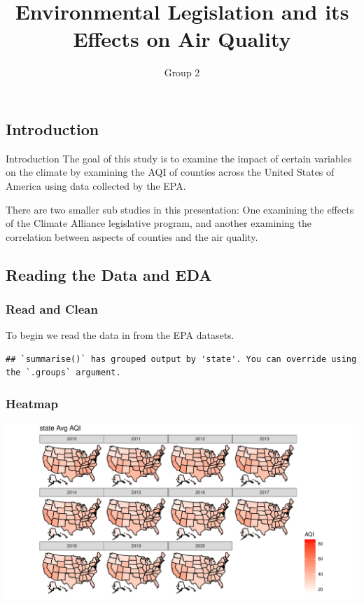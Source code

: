 \documentclass[
  ignorenonframetext,
]{beamer}
\title{Environmental Legislation and its Effects on Air Quality}
\author{Group 2}
\date{}
\begin{document}
\frame{\titlepage}

\hypertarget{introduction}{%
\subsection{Introduction}\label{introduction}}

\begin{frame}{Introduction}
The goal of this study is to examine the impact of certain variables on
the climate by examining the AQI of counties across the United States of
America using data collected by the EPA.

There are two smaller sub studies in this presentation: One examining
the effects of the Climate Alliance legislative program, and another
examining the correlation between aspects of counties and the air
quality.
\end{frame}

\hypertarget{reading-the-data-and-eda}{%
\subsection{Reading the Data and EDA}\label{reading-the-data-and-eda}}

\begin{frame}[fragile]
\frametitle{Read and Clean}

To begin we read the data in from the EPA datasets.

\tiny

\begin{verbatim}
## `summarise()` has grouped output by 'state'. You can override using the `.groups` argument.
\end{verbatim}
\end{frame}

\begin{frame}
\frametitle{Heatmap}

\includegraphics{final_files/figure-beamer/heatmap-1.pdf}
\end{frame}
\end{document}
